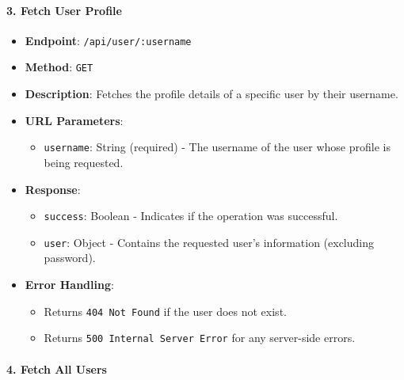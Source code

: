 \hypertarget{fetch-user-profile}{%
\paragraph{3. Fetch User Profile}\label{fetch-user-profile}}

\begin{itemize}
\tightlist
\item
  \textbf{Endpoint}: \texttt{/api/user/:username}
\item
  \textbf{Method}: \texttt{GET}
\item
  \textbf{Description}: Fetches the profile details of a specific user
  by their username.
\item
  \textbf{URL Parameters}:

  \begin{itemize}
  \tightlist
  \item
    \texttt{username}: String (required) - The username of the user
    whose profile is being requested.
  \end{itemize}
\item
  \textbf{Response}:

  \begin{itemize}
  \tightlist
  \item
    \texttt{success}: Boolean - Indicates if the operation was
    successful.
  \item
    \texttt{user}: Object - Contains the requested user's information
    (excluding password).
  \end{itemize}
\item
  \textbf{Error Handling}:

  \begin{itemize}
  \tightlist
  \item
    Returns \texttt{404\ Not\ Found} if the user does not exist.
  \item
    Returns \texttt{500\ Internal\ Server\ Error} for any server-side
    errors.
  \end{itemize}
\end{itemize}

\hypertarget{fetch-all-users}{%
\paragraph{4. Fetch All Users}\label{fetch-all-users}}

